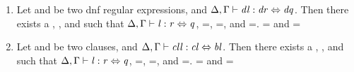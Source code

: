 \begin{lemma}\leavevmode
\begin{enumerate}
\item Let \DNFRegex{} and \DNFRegexAlt{} be two dnf regular expressions, and $\Delta, \Gamma \vdash \mathit{dl} : \mathit{dr} \Leftrightarrow \mathit{dq}$.  Then there exists a \Lens{}, \Regex{}, and \RegexAlt{} such that $\Delta, \Gamma \vdash \mathit{l} : \mathit{r} \Leftrightarrow \mathit{q}$, \PutRightOf{\Lens}=\PutRightOf{\DNFLens}, \LanguageOf{\Delta}{\Regex}=\LanguageOf{\Delta}{\DNFRegex}, and \LanguageOf{\Delta}{\RegexAlt}=\LanguageOf{\Delta}{\DNFRegexAlt}.  \LanguageOf{\Delta{}}{\Regex{}} = \LanguageOf{\Delta{}}{\DNFRegex{}} and
\LanguageOf{\Delta{}}{\RegexAlt{}} = \LanguageOf{\Delta{}}{\DNFRegexAlt{}}

\item Let \Clause{} and \ClauseAlt{} be two clauses, and $\Delta, \Gamma \vdash \mathit{cll} : \mathit{cl} \Leftrightarrow \mathit{bl}$.  Then there exists a \Lens{}, \Regex{}, and \RegexAlt{} such that $\Delta, \Gamma \vdash \mathit{l} : \mathit{r} \Leftrightarrow \mathit{q}$, \PutRightOf{\Lens}=\PutRightOf{\ClauseLens}, \LanguageOf{\Delta}{\Regex}=\LanguageOf{\Delta}{\Clause}, and \LanguageOf{\Delta}{\RegexAlt}=\LanguageOf{\Delta}{\ClauseAlt}.  \LanguageOf{\Delta{}}{\Regex{}} = \LanguageOf{\Delta{}}{\Clause{}} and
\LanguageOf{\Delta{}}{\RegexAlt{}} = \LanguageOf{\Delta{}}{\ClauseAlt{}}


\end{enumerate}
\end{lemma}
